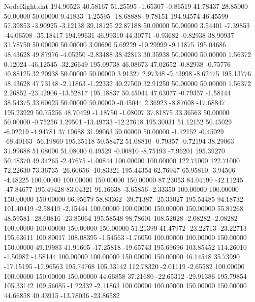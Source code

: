 \begin{filecontents}{NodeRight.dat}
 194.90523   40.58167   51.25595    -1.65307   -0.86519   41.78437   28.85000   50.00000   50.00000    9.41833   -1.25595  -18.68888   -9.78151
 194.94574   46.45599   57.39853    -3.90925   -3.12138   39.18125   22.87188   50.00000   50.00000    3.54401   -7.39853  -44.06508  -35.18417
 194.99631   46.99310   44.30771    -0.93682   -0.82938   38.90937   31.78750   50.00000   50.00000    3.00690    5.69229  -10.29999   -9.11875
 195.04686   48.43628   49.87976    -4.05250   -2.83488   38.42813   30.35938   50.00000   50.00000    1.56372    0.12024  -46.12545  -32.26649
 195.09738   46.08673   47.02652    -0.82938   -0.75776   40.88125   32.20938   50.00000   50.00000    3.91327    2.97348   -9.43998   -8.62475
 195.13776   48.43628   47.73148    -2.11863   -1.22332   40.27500   32.91250   50.00000   50.00000    1.56372    2.26852  -23.42906  -13.52817
 195.18837   50.45044   47.63077    -0.79357   -1.58144   38.54375   33.60625   50.00000   50.00000   -0.45044    2.36923   -8.87608  -17.68847
 195.23929   50.75256   48.70499    -1.18750   -1.08007   37.81875   33.36563   50.00000   50.00000   -0.75256    1.29501  -13.49733  -12.27618
 195.30031   51.12152   50.45029    -6.02219   -4.94781   37.19688   31.99063   50.00000   50.00000   -1.12152   -0.45029  -68.40163  -56.19860
 195.35118   50.58472   51.08810    -0.79357   -0.72194   38.29063   31.99688   51.08000   51.08000    0.49529   -0.00810   -8.75193   -7.96201
 195.39270   50.48370   49.34265    -2.47675   -1.00844  100.00000  100.00000  122.71000  122.71000   72.22630   73.36735  -26.60656  -10.83321
 195.44354   62.76947   65.95810    -3.94506   -4.48225  100.00000  100.00000  150.00000  150.00000   87.23053   84.04190  -42.11245  -47.84677
 195.49428   83.04321   91.16638    -3.65856   -2.33350  100.00000  100.00000  150.00000  150.00000   66.95679   58.83362  -39.71387  -25.33027
 195.54485   94.18732  101.40419    -2.58419   -2.15444  100.00000  100.00000  150.00000  150.00000   55.81268   48.59581  -28.60816  -23.85064
 195.58548   98.78601  108.52028    -2.08282   -2.08282  100.00000  100.00000  150.00000  150.00000   51.21399   41.47972  -23.22713  -23.22713
 195.63611  100.80017  108.08395    -1.54563   -1.76050  100.00000  100.00000  150.00000  150.00000   49.19983   41.91605  -17.25818  -19.65743
 195.69696  103.85452  114.26010    -1.50982   -1.58144  100.00000  100.00000  150.00000  150.00000   46.14548   35.73990  -17.15195  -17.96563
 195.74768  105.33142  112.78320    -2.01119   -2.65582  100.00000  100.00000  150.00000  150.00000   44.66858   37.21680  -22.65312  -29.91386
 195.79854  105.33142  109.56085    -1.22332   -2.11863  100.00000  100.00000  150.00000  150.00000   44.66858   40.43915  -13.78036  -23.86582

\end{filecontents}

